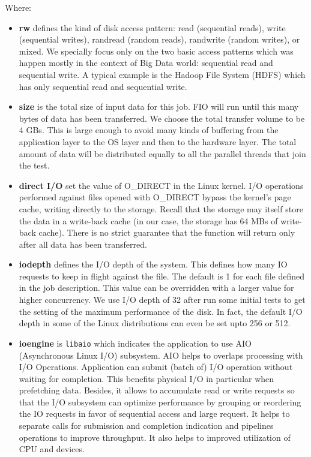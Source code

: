 \documentclass{acmsig}
\begin{document}
Where:
\begin{itemize}
  \item \textbf{rw} defines the kind of disk access pattern: read (sequential reads), write (sequential writes), randread (random reads), randwrite (random writes), or mixed. We specially focus only on the two basic access patterns which was happen mostly in the context of Big Data world: sequential read and sequential write. A typical example is the Hadoop File System (HDFS) which has only sequential read and sequential write.
 \item \textbf{size} is the total size of input data for this job. FIO will run until this many bytes of data has been transferred. We choose the total transfer volume to be 4 GBs. This is large enough to avoid many kinds of buffering from the application layer to the OS layer and then to the hardware layer. The total amount of data will be distributed equally to all the parallel threads that join the test.
  \item \textbf{direct I/O} set the value of O\_DIRECT in the Linux kernel. I/O operations performed against files opened with O\_DIRECT bypass the kernel's page cache, writing directly to the storage. Recall that the storage may itself store the data in a write-back cache (in our case, the storage has 64 MBs of write-back cache). There is no strict guarantee that the function will return only after all data has been transferred.
  \item \textbf{iodepth} defines the I/O depth of the system. This defines how many IO requests to keep in flight against the file. The default is 1 for each file defined in the job description. This value can be overridden with a larger value for higher concurrency. We use I/O depth of 32 after run some initial tests to get the setting of the maximum performance of the disk. In fact, the default I/O depth in some of the Linux distributions can even be set upto 256 or 512.
  \item \textbf{ioengine} is \texttt{libaio} which indicates the application to use AIO (Asynchronous Linux I/O) subsystem. AIO helps to overlaps processing with I/O Operations. Application can submit (batch of) I/O operation without waiting for completion. This benefits physical I/O in particular when prefetching data. Besides, it allows to accumulate read or write requests so that the I/O subsystem can optimize performance by grouping or reordering the IO requests in favor of sequential access and large request. It helps to separate calls for submission and completion indication and pipelines operations to improve throughput. It also helps to improved utilization of CPU and devices.
\end{itemize}
\end{document}
